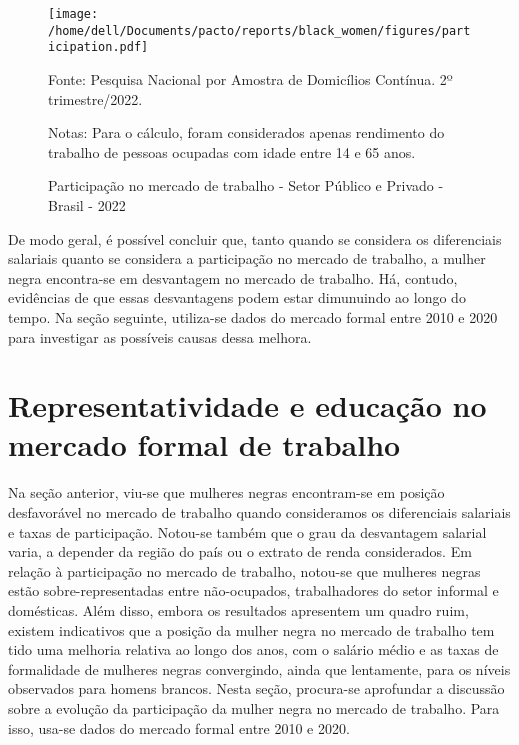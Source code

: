 \documentclass[12pt]{article}
\begin{document}
\begin{figure}[H]
    \centering
    \caption{Participação no mercado de trabalho - Setor Público e Privado - Brasil - 2022}
        \texttt{[image: /home/dell/Documents/pacto/reports/black\_women/figures/participation.pdf]}
    \label{fig:participation}
    \begin{floatnotes}
        \item[Fonte:] Pesquisa Nacional por Amostra de Domicílios Contínua. 2º trimestre/2022.
        \item[Notas:] Para o cálculo, foram considerados apenas rendimento do trabalho de pessoas ocupadas com idade entre 14 e 65 anos.
    \end{floatnotes}
\end{figure}

\par De modo geral, é possível concluir que, tanto quando se considera os diferenciais salariais quanto se considera a participação no mercado de trabalho, a mulher negra encontra-se em desvantagem no mercado de trabalho. Há, contudo, evidências de que essas desvantagens podem estar dimunuindo ao longo do tempo. Na seção seguinte, utiliza-se dados do mercado formal entre 2010 e 2020 para investigar as possíveis causas dessa melhora.






\section{Representatividade e educação no mercado formal de trabalho} \label{rais_representatividade}

\par Na seção anterior, viu-se que mulheres negras encontram-se em posição desfavorável no mercado de trabalho quando consideramos os diferenciais salariais e taxas de participação. Notou-se também que o grau da desvantagem salarial varia, a depender da região do país ou o extrato de renda considerados. Em relação à participação no mercado de trabalho, notou-se que mulheres negras estão sobre-representadas entre não-ocupados, trabalhadores do setor informal e domésticas.
Além disso, embora os resultados apresentem um quadro ruim, existem indicativos que a posição da mulher negra no mercado de trabalho tem tido uma melhoria relativa ao longo dos anos, com o salário médio e as taxas de formalidade de mulheres negras convergindo, ainda que lentamente, para os níveis observados para homens brancos. Nesta seção, procura-se aprofundar a discussão sobre a evolução da participação da mulher negra no mercado de trabalho. Para isso, usa-se dados do mercado formal entre 2010 e 2020. 
\end{document}

